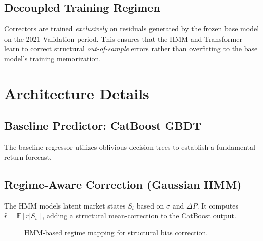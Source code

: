 \documentclass[11pt]{article}
\begin{document}
\subsection{Decoupled Training Regimen}
Correctors are trained \textit{exclusively} on residuals generated by the frozen base model on the 2021 Validation period. This ensures that the HMM and Transformer learn to correct structural \textit{out-of-sample} errors rather than overfitting to the base model's training memorization.

\section{Architecture Details}

\subsection{Baseline Predictor: CatBoost GBDT}
The baseline regressor utilizes oblivious decision trees to establish a fundamental return forecast. 

\subsection{Regime-Aware Correction (Gaussian HMM)}
The HMM models latent market states $S_t$ based on $\sigma$ and $\Delta P$. It computes $\hat{r} = \mathbb{E}[r | S_t]$, adding a structural mean-correction to the CatBoost output.

\begin{figure}[h]
\centering
{}
\caption{HMM-based regime mapping for structural bias correction.}
\end{figure}
\end{document}
